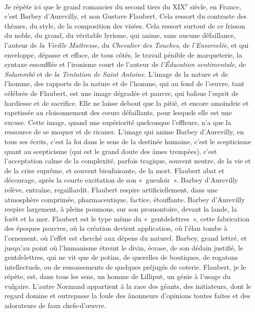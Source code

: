 \documentclass[french,twoside]{book} %
\begin{document}
Je répète ici que le grand romancier du second tiers du XIX\textsuperscript{e} siècle, en France, c’est Barbey d’Aurevilly, et non Gustave Flaubert. Cela ressort du contraste des thèmes, du style, de la composition des visées. Cela ressort surtout de ce frisson du noble, du grand, du véritable lyrisme, qui anime, sans aucune défaillance, l’auteur de {\itshape la Vieille Maîtresse}, du {\itshape Chevalier des Touches}, de {\itshape l’Ensorcelée}, et qui enveloppe, dépasse et efface, de tous côtés, le travail pénible de marqueterie, la syntaxe essoufflée et l’ironisme court de l’auteur de {\itshape l’Éducation sentimentale}, de {\itshape Salammbô} et de {\itshape la Tentation de Saint Antoine}. L’image de la nature et de l’homme, des rapports de la nature et de l’homme, qui au fond de l’œuvre, tant célébrée de Flaubert, est une image dégradée et pauvre, qui bafoue l’esprit de hardiesse et de sacrifice. Elle ne laisse debout que la pitié, et encore amoindrie et rapetissée au cloisonnement des cœurs défaillants, pour lesquels elle est une excuse. Cette image, quand une supériorité quelconque l’effleure, n’a que la ressource de se moquer et de ricaner. L’image qui anime Barbey d’Aurevilly, en tous ses écrits, c’est la foi dans le sens de la destinée humaine, c’est le scepticisme quant au scepticisme (qui est le grand doute des âmes trempées), c’est l’acceptation calme de la complexité, parfois tragique, souvent neutre, de la vie et de la crise suprême, et souvent bienfaisante, de la mort. Flaubert abat et décourage, après la courte excitation de son « gueuloir ». Barbey d’Aurevilly relève, entraîne, regaillardit. Flaubert respire artificiellement, dans une atmosphère comprimée, pharmaceutique, factice, étouffante. Barbey d’Aurevilly respire largement, à pleins poumons, sur son promontoire, devant la lande, la forêt et la mer. Flaubert est le type même du « gentdelettres », cette fabrication des époques pauvres, où la création devient application, où l’élan tombe à l’ornement, où l’effet est cherché aux dépens du naturel. Barbey, grand lettré, et jusqu’au point où l’humanisme étreint le divin, écrase, de son dédain justifié, le gentdelettres, qui ne vit que de potins, de querelles de boutiques, de rogatons intellectuels, ou de ressassements de quelques préjugés de coterie. Flaubert, je le répète, est, dans tous les sens, un homme de Lilliput, un génie à l’usage du vulgaire. L’autre Normand appartient à la race des géants, des initiateurs, dont le regard domine et outrepasse la foule des ânonneurs d’opinions toutes faites et des adorateurs de faux chefs-d’œuvre.\par
\end{document}
